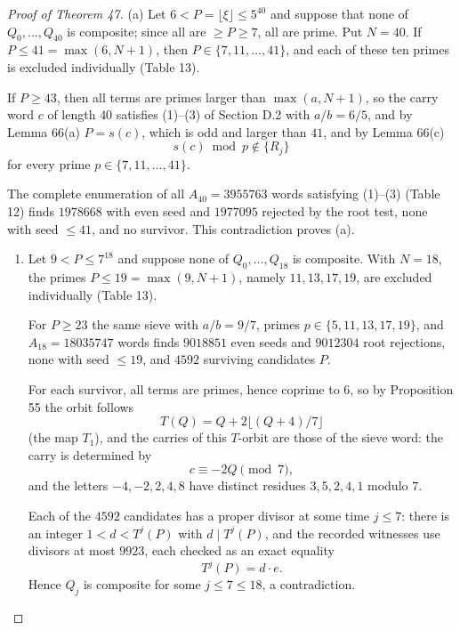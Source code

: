 \documentclass[11pt,reqno]{amsart}
\theoremstyle{definition}
\theoremstyle{remark}
\begin{document}
\begin{proof}[Proof of Theorem 47]\leavevmode\label{proof:47}
(a) Let \(6<P=\lfloor\xi\rfloor\le5^{40}\) and
suppose that none of \(Q_0,\ldots,Q_{40}\) is composite; since all are
\(\ge P\ge7\), all are prime. Put \(N=40\). If \(P\le41=\max(6,N+1)\),
then \(P\in\{7,11,\ldots,41\}\), and each of these ten primes is
excluded individually (Table 13).

If \(P\ge43\), then all terms are
primes larger than \(\max(a,N+1)\), so the carry word \(c\) of length
\(40\) satisfies (1)--(3) of Section D.2 with \(a/b=6/5\), and by Lemma
66(a) \(P=s(c)\), which is odd and larger than \(41\), and by Lemma
66(c)
\[
s(c)\bmod p\notin\{R_j\}
\]
for every prime
\(p\in\{7,11,\ldots,41\}\).

The complete enumeration of all
\(A_{40}=3955763\) words satisfying (1)--(3) (Table 12) finds
\(1978668\) with even seed and \(1977095\) rejected by the root test,
none with seed \(\le41\), and no survivor. This contradiction proves
(a).

\begin{enumerate}
\def\labelenumi{(\alph{enumi})}
\setcounter{enumi}{1}
\item
  Let \(9<P\le7^{18}\) and suppose none of \(Q_0,\ldots,Q_{18}\) is
  composite. With \(N=18\), the primes \(P\le19=\max(9,N+1)\), namely
  \(11,13,17,19\), are excluded individually (Table 13).

  For \(P\ge23\)
  the same sieve with \(a/b=9/7\), primes \(p\in\{5,11,13,17,19\}\), and
  \(A_{18}=18035747\) words finds \(9018851\) even seeds and \(9012304\)
  root rejections, none with seed \(\le19\), and \(4592\) surviving
  candidates \(P\).

  For each survivor, all terms are primes, hence coprime
  to \(6\), so by Proposition 55 the orbit follows
  \[
  T(Q)=Q+2\lfloor(Q+4)/7\rfloor
  \]
  (the map \(T_1\)), and the carries of
  this \(T\)-orbit are those of the sieve word: the carry is determined by
  \[
  c\equiv-2Q\pmod7,
  \]
  and the letters \(-4,-2,2,4,8\) have distinct
  residues \(3,5,2,4,1\) modulo \(7\).

  Each of the \(4592\) candidates
  has a proper divisor at some time \(j\le7\): there is an integer
  \(1<d<T^j(P)\) with \(d\mid T^j(P)\), and the recorded witnesses use
  divisors at most \(9923\), each checked as an exact equality
  \[
  T^j(P)=d\cdot e.
  \]
  Hence \(Q_j\) is composite for some \(j\le7\le18\),
  a contradiction. \qedhere
\end{enumerate}
\end{proof}
\end{document}
